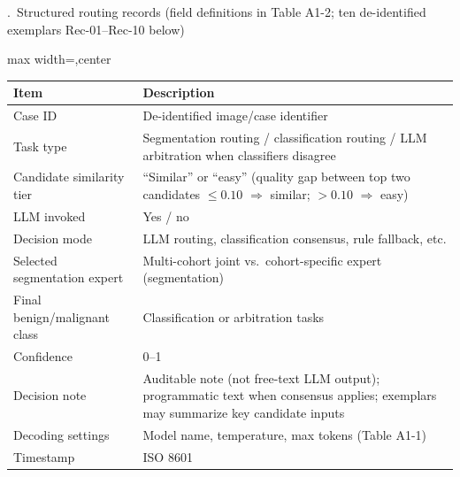 \begin{responseappendixprose}
\par
{}.~Structured routing records (field definitions in Table A1-2; ten de-identified exemplars Rec-01--Rec-10 below)
\par
\begin{responseinlinetable}
\label{tab_A1_log_fields}
\begin{adjustbox}{max width=\textwidth,center}
\begin{tabular}{ll}
\toprule
Item & Description \\
\midrule
Case ID & De-identified image/case identifier \\
Task type & Segmentation routing / classification routing / LLM arbitration when classifiers disagree \\
Candidate similarity tier & ``Similar'' or ``easy'' (quality gap between top two candidates $\leq 0.10$ $\Rightarrow$ similar; $>0.10$ $\Rightarrow$ easy) \\
LLM invoked & Yes / no \\
Decision mode & LLM routing, classification consensus, rule fallback, etc. \\
Selected segmentation expert & Multi-cohort joint vs.\ cohort-specific expert (segmentation) \\
Final benign/malignant class & Classification or arbitration tasks \\
Confidence & 0--1 \\
Decision note & Auditable note (not free-text LLM output); programmatic text when consensus applies; exemplars may summarize key candidate inputs \\
Decoding settings & Model name, temperature, max tokens (Table A1-1) \\
Timestamp & ISO 8601 \\
\bottomrule
\end{tabular}
\end{adjustbox}
\end{responseinlinetable}
\par

\par
\end{responseappendixprose}
\FloatBarrier
\responseproseappendixstart
